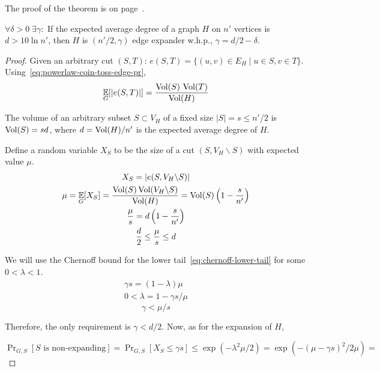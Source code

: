 The proof of the theorem is on page~\pageref*{prf:powerlaw-coin-toss-edge-expansion}.

\begin{lemma}
    \label{lem:coin-toss-lemma-d}
    $\forall\delta>0\;\exists\gamma:$
    If the expected average degree of a graph $H$ on $n'$ vertices is $d>10\ln n'$,
    then $H$ is $(n'/2,\gamma)$ edge expander w.h.p., $\gamma=d/2-\delta$.
\end{lemma}

\begin{proof}
    Given an arbitrary cut $(S,T)$: $e(S,T)=\{(u,v)\in E_H\;|\;u\in S,v\in T\}$.
    Using~\eqref{eq:powerlaw-coin-toss-edge-pr},
    \begin{equation}
        \mathop{{}\mathbb{E}}_G[|e(S,T)|]=\frac{\operatorname*{Vol}(S)\,\operatorname*{Vol}(T)}{\operatorname*{Vol}(H)}
    \end{equation}
    
    The volume of an arbitrary subset $S\subset V_H$ of a fixed size $|S|=s\leq n'/2$
    is $\operatorname*{Vol}(S)=sd$, where $d=\operatorname*{Vol}(H)/n'$ is the expected average degree of $H$.
    
    Define a random variable $X_S$ to be the size of a cut $(S,V_H\backslash S)$ with expected value $\mu$.
    \begin{gather}
        X_S=|e(S,V_H\backslash S)|\\
        \mu=\mathop{{}\mathbb{E}}_G[X_S]=\frac{\operatorname*{Vol}(S)\operatorname*{Vol}(V_H\backslash S)}{\operatorname*{Vol}(H)}=\operatorname*{Vol}(S)\left(1-\frac{s}{n'}\right)\\
        \frac{\mu}{s}=d\left(1-\frac{s}{n'}\right)\\
        \frac{d}{2}\leq\frac{\mu}{s}\leq d
    \end{gather}
    
    We will use the Chernoff bound for the lower tail~\eqref{eq:chernoff-lower-tail}
    for some $0<\lambda<1$.
    \begin{gather*}
        \gamma s=(1-\lambda)\mu\\
        0<\lambda=1-\gamma s/\mu
    \end{gather*}
    \begin{equation}
        \label{eq:powerlaw-coin-toss-expansion-bound}
        \gamma<\mu/s
    \end{equation}
    
    Therefore, the only requirement is $\gamma<d/2$. Now, as for the expansion of $H$,
    
    $\Pr_{G,S}[S\text{ is non-expanding}]=\Pr_{G,S}[X_S\leq\gamma s]\leq \exp(-\lambda^2\mu/2)
    =\exp(-(\mu-\gamma s)^2/2\mu)=$
    

\end{proof}
